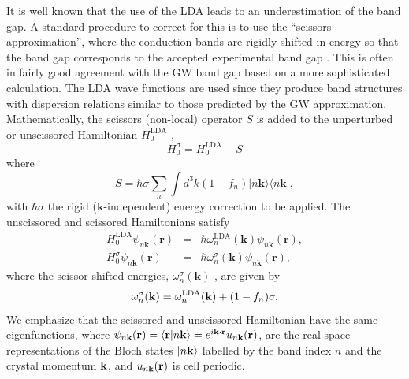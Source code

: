\documentclass[floatfix,prb,aps,superscriptaddress,11pt,preprint,letterpaper]{revtex4}
\def\chon{black}
\begin{document}
{\color{\chon} It} is well known that the use of the {\color{\chon} LDA} 
leads to an underestimation of the band gap. A standard
procedure to correct for this is to
use {\color{\chon} the} ``scissors approximation'', {\color{\chon} where the 
conduction bands are rigidly shifted in energy} so that the band gap 
corresponds to the accepted experimental band gap{\color{\chon} .
This} is often in fairly good agreement with the GW
band gap based on a more sophisticated calculation.\cite{hybertsenPRB86}
{\color{\chon} T}he LDA wave functions are used since they produce band
structures with dispersion relations similar to those predicted by the GW
approximation. Mathematically, {\color{\chon} the scissors (non-local) operator 
$S$ is added} to the unperturbed or unscissored Hamiltonian {\color{\chon} $H^{\mathrm{LDA}}_{0}$ ,}
\begin{equation*}
H^\sigma_{0}=H^{\mathrm{LDA}}_{0}+S
\end{equation*}
where 
\begin{equation}
S=\hbar \sigma\sum_{n}\int d^{3}k(1-f_{n})
|n\mathbf{k}\rangle\langle n\mathbf{k}|,
\label{hats}
\end{equation}
with $\hbar \sigma$  the rigid ($\mathbf{k}$-independent) energy correction to be
applied. 
The unscissored and scissored Hamiltonians satisfy 
\begin{eqnarray*}
H^{\mathrm{LDA}}_{0}\psi _{n\mathbf{k}}(\mathbf{r}) &=&\hbar \omega^{\mathrm{LDA}}_{n}(\mathbf{k})\psi _{n\mathbf{k}}(\mathbf{r}),
\label{hamils} \\
H_{0}^\sigma\psi _{n\mathbf{k}}(\mathbf{r}) &=&\hbar \omega_{n}^\sigma
(\mathbf{k})\psi _{n\mathbf{k}}(\mathbf{r}),
\end{eqnarray*}
where the scissor-shifted energies, 
$\omega_{n}^\sigma(\mathbf{k})$ , are given by
\begin{equation}
\omega_{n}^\sigma(\mathbf{k})=\omega^{\mathrm{LDA}}_{n}(\mathbf{k})+(1-f_{n})\sigma.
\label{wese}
\end{equation}
We emphasize that the {\color{\chon} scissored and unscissored Hamiltonian 
have the same eigenfunctions,} where
$\psi_{n\mathbf{k}}(\mathbf{r})=\langle {\mathbf{r}} | {n\mathbf{k}} \rangle=e^{i\mathbf{k}\cdot\mathbf{r}}u_{n\mathbf{k}}(\mathbf{r})$,
are the real space representations of the Bloch states $| n\mathbf{k} \rangle$ labelled 
by the band index $n$ and the crystal momentum $\mathbf{k}$, and $u_{n\mathbf{k}}(\mathbf{r})$
is cell periodic. 
\end{document}
